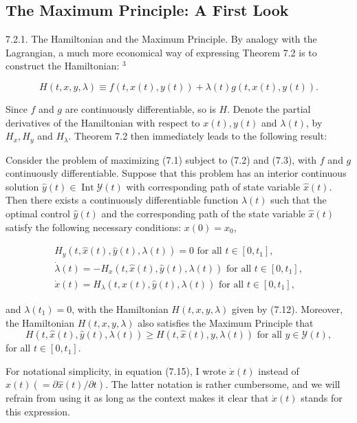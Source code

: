 \documentclass[\topdir/lecture_notes.tex]{subfiles}
\begin{document}
\subsection{The Maximum Principle: A First Look}
7.2.1. The Hamiltonian and the Maximum Principle. By analogy with the Lagrangian, a much more economical way of expressing Theorem 7.2 is to construct the Hamiltonian: ${ }^{3}$

\[
H(t, x, y, \lambda) \equiv f(t, x(t), y(t))+\lambda(t) g(t, x(t), y(t)) .
\]

Since $f$ and $g$ are continuously differentiable, so is $H$. Denote the partial derivatives of the Hamiltonian with respect to $x(t), y(t)$ and $\lambda(t)$, by $H_{x}, H_{y}$ and $H_{\lambda}$. Theorem 7.2 then immediately leads to the following result:

\begin{theorem}
Consider the problem of maximizing (7.1) subject to (7.2) and (7.3), with $f$ and $g$ continuously differentiable. Suppose that this problem has an interior continuous solution $\hat{y}(t) \in \operatorname{Int} \mathcal{Y}(t)$ with corresponding path of state variable $\hat{x}(t)$. Then there exists a continuously differentiable function $\lambda(t)$ such that the optimal control $\hat{y}(t)$ and the corresponding path of the state variable $\hat{x}(t)$ satisfy the following necessary conditions: $x(0)=x_0$,

\[
\begin{gathered}
H_{y}(t, \hat{x}(t), \hat{y}(t), \lambda(t))=0 \text { for all } t \in\left[0, t_{1}\right], \\
\dot{\lambda}(t)=-H_{x}(t, \hat{x}(t), \hat{y}(t), \lambda(t)) \text { for all } t \in\left[0, t_{1}\right], \\
\dot{x}(t)=H_{\lambda}(t, \hat{x}(t), \hat{y}(t), \lambda(t)) \text { for all } t \in\left[0, t_{1}\right],
\end{gathered}
\]

and $\lambda\left(t_1\right)=0$, with the Hamiltonian $H(t, x, y, \lambda)$ given by (7.12). Moreover, the Hamiltonian $H(t, x, y, \lambda)$ also satisfies the Maximum Principle that
\[
H(t, \hat{x}(t), \hat{y}(t), \lambda(t)) \geq H(t, \hat{x}(t), y, \lambda(t)) \text { for all } y \in \mathcal{Y}(t),
\]
for all $t \in\left[0, t_1\right]$.
\end{theorem}
For notational simplicity, in equation (7.15), I wrote $\dot{x}(t)$ instead of $\hat{x}(t)(=\partial \hat{x}(t) / \partial t)$. The latter notation is rather cumbersome, and we will refrain from using it as long as the context makes it clear that $\dot{x}(t)$ stands for this expression.
\end{document}
